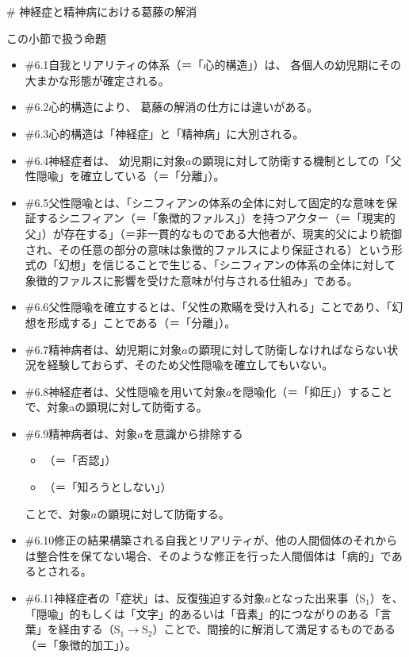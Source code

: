 \# 神経症と精神病における葛藤の解消

\begin{note}{この小節で扱う命題}
  \begin{itemize}
    \tightlist
    \item{\#6.1}自我とリアリティの体系（＝「心的構造」）は、  各個人の幼児期にその大まかな形態が確定される。
    \item{\#6.2}心的構造により、  葛藤の解消の仕方には違いがある。
    \item{\#6.3}心的構造は「神経症」と「精神病」に大別される。
    \item{\#6.4}神経症者は、  幼児期に対象$a$の顕現に対して防衛する機制としての「父性隠喩」を確立している（＝「分離」）。
    \item{\#6.5}父性隠喩とは、「シニフィアンの体系の全体に対して固定的な意味を保証するシニフィアン（＝「象徴的ファルス」）を持つアクター（＝「現実的父」）が存在する」（＝非一貫的なものである大他者が、現実的父により統御され、その任意の部分の意味は象徴的ファルスにより保証される）という形式の「幻想」を信じることで生じる、「シニフィアンの体系の全体に対して象徴的ファルスに影響を受けた意味が付与される仕組み」である。
    \item{\#6.6}父性隠喩を確立するとは、「父性の欺瞞を受け入れる」ことであり、「幻想を形成する」ことである（＝「分離」）。
    \item{\#6.7}精神病者は、幼児期に対象$a$の顕現に対して防衛しなければならない状況を経験しておらず、そのため父性隠喩を確立してもいない。
    \item{\#6.8}神経症者は、父性隠喩を用いて対象$a$を隠喩化（＝「抑圧」）することで、対象aの顕現に対して防衛する。
    \item{\#6.9}精神病者は、対象$a$を意識から排除する
      \begin{itemize}
        \tightlist
        \item （＝「否認」）
        \item （＝「知ろうとしない」）
      \end{itemize}ことで、対象$a$の顕現に対して防衛する。
    \item{\#6.10}修正の結果構築される自我とリアリティが、他の人間個体のそれからは整合性を保てない場合、そのような修正を行った人間個体は「病的」であるとされる。
    \item{\#6.11}神経症者の「症状」は、反復強迫する対象$a$となった出来事（$\textrm{S}_1$）を、「隠喩」的もしくは「文字」的あるいは「音素」的につながりのある「言葉」を経由する（$\textrm{S}_1\rightarrow\textrm{S}_2$）ことで、間接的に解消して満足するものである（＝「象徴的加工」）。

\end{itemize}
\end{note}
